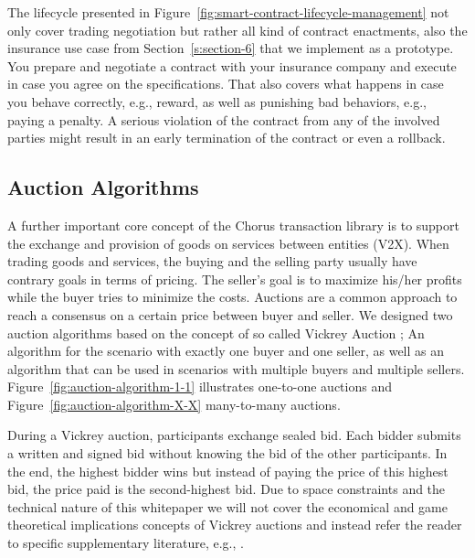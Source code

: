 \documentclass{llncs}
\begin{document}
{			The lifecycle presented in Figure~\ref{fig:smart-contract-lifecycle-management} not only cover trading negotiation but rather all kind of contract enactments, also the insurance use case from Section~\ref{s:section-6} that we implement as a prototype. You prepare and negotiate a contract with your insurance company and execute in case you agree on the specifications. That also covers what happens in case you behave correctly, e.g., reward, as well as punishing bad behaviors, e.g., paying a penalty. A serious violation of the contract from any of the involved parties might result in an early termination of the contract or even a rollback.



		
		\subsection{Auction Algorithms}
			\label{ss:auchtion-algorithm}				

			A further important core concept of the Chorus transaction library is to support the exchange and provision of goods on services between entities (V2X). When trading goods and services, the buying and the selling party usually have contrary goals in terms of pricing. The seller's goal is to maximize his/her profits while the buyer tries to minimize the costs. Auctions are a common approach to reach a consensus on a certain price between buyer and seller. We designed two auction algorithms based on the concept of so called Vickrey Auction \cite{moldovanu1998goethe}\cite{vickrey1961counterspeculation}; An algorithm for the scenario with exactly one buyer and one seller, as well as an algorithm that can be used in scenarios with multiple buyers and multiple sellers. Figure~\ref{fig:auction-algorithm-1-1} illustrates one-to-one auctions and Figure~\ref{fig:auction-algorithm-X-X} many-to-many auctions.
			
			During a Vickrey auction, participants exchange sealed bid. Each bidder submits a written and signed bid without knowing the bid of the other participants. In the end, the highest bidder wins but instead of paying the price of this highest bid, the price paid is the second-highest bid. Due to space constraints and the technical nature of this whitepaper we will not cover the economical and game theoretical implications concepts of Vickrey auctions and instead refer the reader to specific supplementary literature, e.g., \cite{ausubel2006lovely}\cite{edelman2007internet}\cite{lucking2000vickrey}\cite{moldovanu1998goethe}\cite{vickrey1961counterspeculation}.

}
\end{document}
